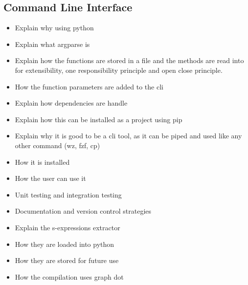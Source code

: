 \subsection{Command Line Interface}

\begin{itemize}
\item Explain why using python
\item Explain what argparse is 
\item Explain how the functions are stored in a file and the methods are read into for extensibility, one responsibility principle and open close principle.
\item How the function parameters are added to the cli 
\item Explain how dependencies are handle 
\item Explain how this can be installed as a project using pip 
\item Explain why it is good to be a cli tool, as it can be piped and used like any other command (wz, fzf, cp) 
\item How it is installed 
\item How the user can use it
\end{itemize}

\begin{itemize}
\item Unit testing and integration testing 
\item Documentation and version control strategies
\end{itemize}

\begin{itemize}
\item Explain the s-expressions extractor
\item How they are loaded into python 
\item How they are stored for future use 
\item How the compilation uses graph dot
\end{itemize}
